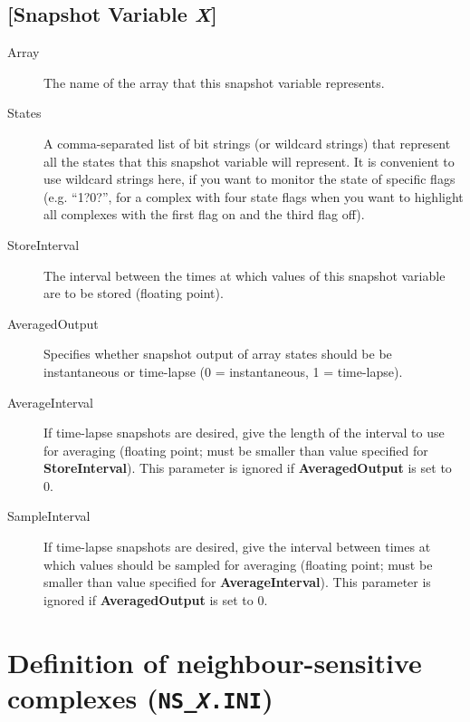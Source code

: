 \subsection{[Snapshot Variable \emph{X}]}
\begin{description}
\item[Array] The name of the array that this snapshot variable represents.
\item[States] A comma-separated list of bit strings (or wildcard
  strings) that represent all the states that this snapshot variable
  will represent.  It is convenient to use wildcard strings here, if
  you want to monitor the state of specific flags (e.g.  ``1?0?'', for
  a complex with four state flags when you want to highlight all
  complexes with the first flag on and the third flag off).
  
\item[StoreInterval] The interval between the times at which values
  of this snapshot variable are to be stored (floating point).

\item[AveragedOutput] Specifies whether snapshot output of array
  states should be be instantaneous or time-lapse (0 = instantaneous,
  1 = time-lapse).
  
\item[AverageInterval] If time-lapse snapshots are desired, give the
  length of the interval to use for averaging (floating point; must be
  smaller than value specified for \textbf{StoreInterval}).  This
  parameter is ignored if \textbf{AveragedOutput} is set to 0.
  
\item[SampleInterval] If time-lapse snapshots are desired, give the
  interval between times at which values should be sampled for
  averaging (floating point; must be smaller than value specified for
  \textbf{AverageInterval}).  This parameter is ignored if
  \textbf{AveragedOutput} is set to 0.
\end{description}

\section{Definition of neighbour-sensitive complexes (\texttt{NS\_\emph{X}.INI})}

